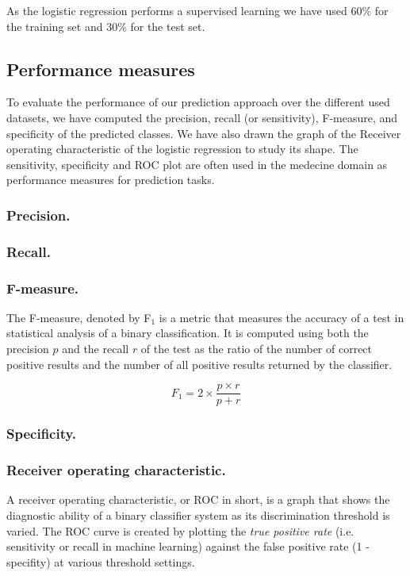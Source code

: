 As the logistic regression performs a supervised learning we have used 60\% for the training set and 30\% for the test set.

\subsection{Performance measures}
To evaluate the performance of our prediction approach over the different used datasets, we have computed the precision,
recall (or sensitivity), F-measure, and specificity of the predicted classes. We have also drawn the graph of the Receiver operating 
characteristic of the logistic regression to study its shape.  
The sensitivity, specificity and ROC plot are often used in the medecine domain as performance measures for prediction tasks.

\subsubsection{Precision.}
\subsubsection{Recall.}
\subsubsection{F-measure.} The F-measure, denoted by F$_1$ is a metric that measures the accuracy of a test in statistical analysis of a binary classification.
It is computed using both the precision $p$ and the recall $r$ of the test as the ratio of the number of correct positive results and the
number of all positive results returned by the classifier. 

\begin{equation}
F_1 = 2 \times \frac{p\times r}{p + r}
\label{f-measure}
\end{equation}
 
\subsubsection{Specificity.}
\subsubsection{Receiver operating characteristic.} A receiver operating characteristic, or ROC in short, is a graph
 that shows the diagnostic ability of a binary classifier system as its discrimination threshold is varied.
The ROC curve is created by plotting the \emph{true positive rate} (i.e. sensitivity or recall in machine learning) 
against the false positive rate (1 - specifity) at various threshold settings. 


